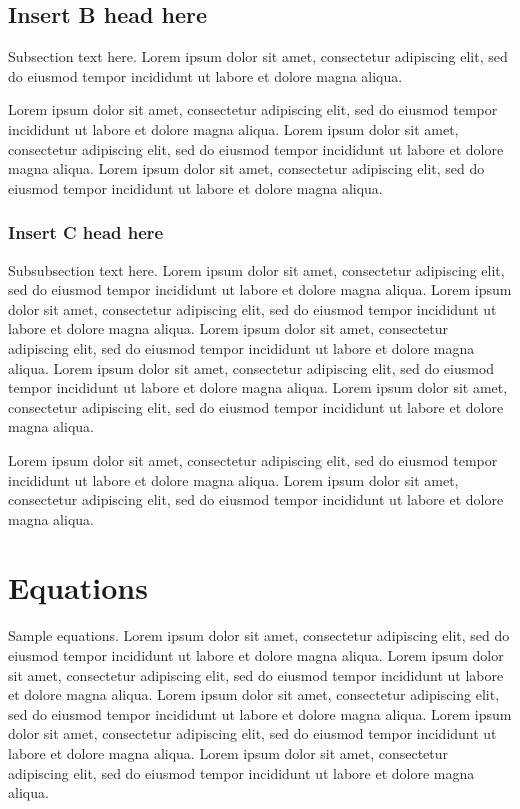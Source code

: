 \documentclass[
  journal=large,
  manuscript=propuesta,
  year=2020,
  volume=37,
]{cup-journal}
\begin{document}
\subsection{Insert B head here}
Subsection text here. Lorem ipsum \citep{Bayer_etal_2013} dolor sit amet, consectetur adipiscing elit, sed do eiusmod tempor incididunt ut labore \citet{Adade_etal_2007} et dolore magna aliqua. 

 Lorem ipsum dolor sit amet, consectetur adipiscing elit, sed do eiusmod tempor incididunt ut labore et dolore magna aliqua. Lorem ipsum dolor sit amet, consectetur adipiscing elit, sed do eiusmod tempor incididunt ut labore et dolore magna aliqua. Lorem ipsum dolor sit amet, consectetur adipiscing elit, sed do eiusmod tempor incididunt ut labore et dolore magna aliqua. 

\subsubsection{Insert C head here}
Subsubsection text here. Lorem ipsum dolor sit amet, consectetur adipiscing elit, sed do eiusmod tempor incididunt ut labore et dolore magna aliqua. Lorem ipsum dolor sit amet, consectetur adipiscing elit, sed do eiusmod tempor incididunt ut labore et dolore magna aliqua. Lorem ipsum dolor sit amet, consectetur adipiscing elit, sed do eiusmod tempor incididunt ut labore et dolore magna aliqua. Lorem ipsum dolor sit amet, consectetur adipiscing elit, sed do eiusmod tempor incididunt ut labore et dolore magna aliqua. Lorem ipsum dolor sit amet, consectetur adipiscing elit, sed do eiusmod tempor incididunt ut labore et dolore magna aliqua. 

Lorem ipsum dolor sit amet, consectetur adipiscing elit, sed do eiusmod tempor incididunt ut labore et dolore magna aliqua. Lorem ipsum dolor sit amet, consectetur adipiscing elit, sed do eiusmod tempor incididunt ut labore et dolore magna aliqua. 

\section{Equations}

Sample equations. Lorem ipsum dolor sit amet, consectetur adipiscing elit, sed do eiusmod tempor incididunt ut labore et dolore magna aliqua. Lorem ipsum dolor sit amet, consectetur adipiscing elit, sed do eiusmod tempor incididunt ut labore et dolore magna aliqua. Lorem ipsum dolor sit amet, consectetur adipiscing elit, sed do eiusmod tempor incididunt ut labore et dolore magna aliqua. Lorem ipsum dolor sit amet, consectetur adipiscing elit, sed do eiusmod tempor incididunt ut labore et dolore magna aliqua. Lorem ipsum dolor sit amet, consectetur adipiscing elit, sed do eiusmod tempor incididunt ut labore et dolore magna aliqua. 
\end{document}
